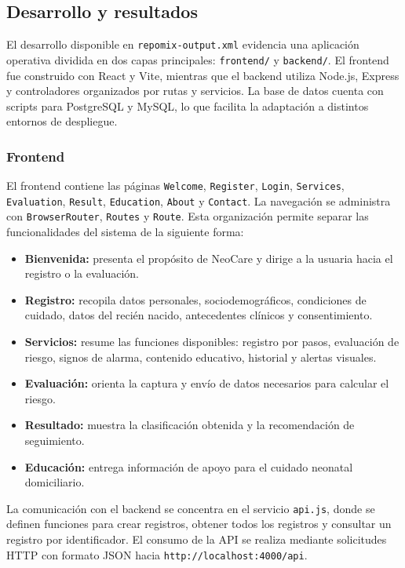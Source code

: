 \documentclass[12pt,letterpaper]{article}
\begin{document}
\subsection{Desarrollo y resultados}

El desarrollo disponible en \texttt{repomix-output.xml} evidencia una aplicación operativa dividida en dos capas principales: \texttt{frontend/} y \texttt{backend/}. El frontend fue construido con React y Vite, mientras que el backend utiliza Node.js, Express y controladores organizados por rutas y servicios. La base de datos cuenta con scripts para PostgreSQL y MySQL, lo que facilita la adaptación a distintos entornos de despliegue.

\subsubsection{Frontend}

El frontend contiene las páginas \texttt{Welcome}, \texttt{Register}, \texttt{Login}, \texttt{Services}, \texttt{Evaluation}, \texttt{Result}, \texttt{Education}, \texttt{About} y \texttt{Contact}. La navegación se administra con \texttt{BrowserRouter}, \texttt{Routes} y \texttt{Route}. Esta organización permite separar las funcionalidades del sistema de la siguiente forma:

\begin{itemize}
    \item \textbf{Bienvenida:} presenta el propósito de NeoCare y dirige a la usuaria hacia el registro o la evaluación.
    \item \textbf{Registro:} recopila datos personales, sociodemográficos, condiciones de cuidado, datos del recién nacido, antecedentes clínicos y consentimiento.
    \item \textbf{Servicios:} resume las funciones disponibles: registro por pasos, evaluación de riesgo, signos de alarma, contenido educativo, historial y alertas visuales.
    \item \textbf{Evaluación:} orienta la captura y envío de datos necesarios para calcular el riesgo.
    \item \textbf{Resultado:} muestra la clasificación obtenida y la recomendación de seguimiento.
    \item \textbf{Educación:} entrega información de apoyo para el cuidado neonatal domiciliario.
\end{itemize}

La comunicación con el backend se concentra en el servicio \texttt{api.js}, donde se definen funciones para crear registros, obtener todos los registros y consultar un registro por identificador. El consumo de la API se realiza mediante solicitudes HTTP con formato JSON hacia \texttt{http://localhost:4000/api}.
\end{document}
